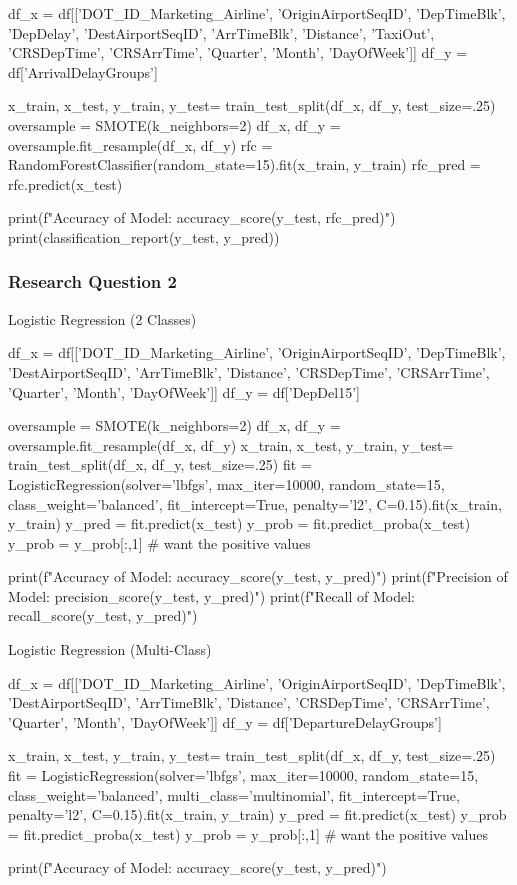\documentclass[a4paper,12pt]{article}
\begin{document}
\begin{python}
df_x = df[['DOT_ID_Marketing_Airline', 'OriginAirportSeqID', 'DepTimeBlk', 'DepDelay', 'DestAirportSeqID', 'ArrTimeBlk', 'Distance', 'TaxiOut', 'CRSDepTime', 'CRSArrTime',
 'Quarter', 'Month', 'DayOfWeek']]
df_y = df['ArrivalDelayGroups']

x_train, x_test, y_train, y_test= train_test_split(df_x, df_y, test_size=.25)
oversample = SMOTE(k_neighbors=2)
df_x, df_y = oversample.fit_resample(df_x, df_y)
rfc = RandomForestClassifier(random_state=15).fit(x_train, y_train)
rfc_pred = rfc.predict(x_test)

print(f"Accuracy of Model: {accuracy_score(y_test, rfc_pred)}")
print(classification_report(y_test, y_pred))
\end{python}

\subsubsection{Research Question 2}

Logistic Regression (2 Classes)

\begin{python}
df_x = df[['DOT_ID_Marketing_Airline', 'OriginAirportSeqID', 'DepTimeBlk', 'DestAirportSeqID', 'ArrTimeBlk', 'Distance', 'CRSDepTime',
 'CRSArrTime', 'Quarter', 'Month', 'DayOfWeek']]
df_y = df['DepDel15']

oversample = SMOTE(k_neighbors=2)
df_x, df_y = oversample.fit_resample(df_x, df_y)
x_train, x_test, y_train, y_test= train_test_split(df_x, df_y, test_size=.25)
fit = LogisticRegression(solver='lbfgs', max_iter=10000, random_state=15, class_weight='balanced', fit_intercept=True, penalty='l2', C=0.15).fit(x_train, y_train)
y_pred = fit.predict(x_test)
y_prob = fit.predict_proba(x_test)
y_prob = y_prob[:,1] # want the positive values

print(f"Accuracy of Model: {accuracy_score(y_test, y_pred)}")
print(f"Precision of Model: {precision_score(y_test, y_pred)}")
print(f"Recall of Model: {recall_score(y_test, y_pred)}")
\end{python}

Logistic Regression (Multi-Class)

\begin{python}
df_x = df[['DOT_ID_Marketing_Airline', 'OriginAirportSeqID', 'DepTimeBlk', 'DestAirportSeqID', 'ArrTimeBlk', 'Distance', 'CRSDepTime',
 'CRSArrTime', 'Quarter', 'Month', 'DayOfWeek']]
df_y = df['DepartureDelayGroups']

x_train, x_test, y_train, y_test= train_test_split(df_x, df_y, test_size=.25)
fit = LogisticRegression(solver='lbfgs', max_iter=10000, random_state=15, class_weight='balanced', multi_class='multinomial', fit_intercept=True, penalty='l2', C=0.15).fit(x_train, y_train)
y_pred = fit.predict(x_test)
y_prob = fit.predict_proba(x_test)
y_prob = y_prob[:,1] # want the positive values

print(f"Accuracy of Model: {accuracy_score(y_test, y_pred)}")
\end{python}
\end{document}
